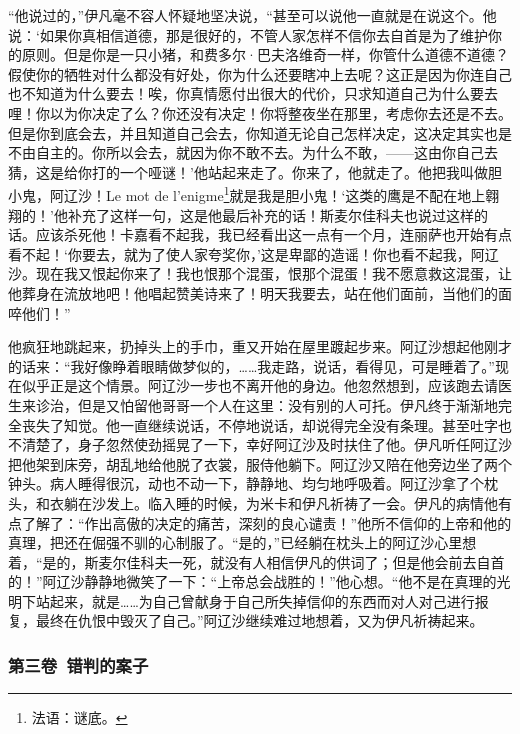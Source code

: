 \par “他说过的，”伊凡毫不容人怀疑地坚决说，“甚至可以说他一直就是在说这个。他说：‘如果你真相信道德，那是很好的，不管人家怎样不信你去自首是为了维护你的原则。但是你是一只小猪，和费多尔·巴夫洛维奇一样，你管什么道德不道德？假使你的牺牲对什么都没有好处，你为什么还要瞎冲上去呢？这正是因为你连自己也不知道为什么要去！唉，你真情愿付出很大的代价，只求知道自己为什么要去哩！你以为你决定了么？你还没有决定！你将整夜坐在那里，考虑你去还是不去。但是你到底会去，并且知道自己会去，你知道无论自己怎样决定，这决定其实也是不由自主的。你所以会去，就因为你不敢不去。为什么不敢，——这由你自己去猜，这是给你打的一个哑谜！’他站起来走了。你来了，他就走了。他把我叫做胆小鬼，阿辽沙！Le mot de l’enigme\footnote{法语：谜底。}就是我是胆小鬼！‘这类的鹰是不配在地上翱翔的！’他补充了这样一句，这是他最后补充的话！斯麦尔佳科夫也说过这样的话。应该杀死他！卡嘉看不起我，我已经看出这一点有一个月，连丽萨也开始有点看不起！‘你要去，就为了使人家夸奖你，’这是卑鄙的造谣！你也看不起我，阿辽沙。现在我又恨起你来了！我也恨那个混蛋，恨那个混蛋！我不愿意救这混蛋，让他葬身在流放地吧！他唱起赞美诗来了！明天我要去，站在他们面前，当他们的面啐他们！”
\par 他疯狂地跳起来，扔掉头上的手巾，重又开始在屋里踱起步来。阿辽沙想起他刚才的话来：“我好像睁着眼睛做梦似的，……我走路，说话，看得见，可是睡着了。”现在似乎正是这个情景。阿辽沙一步也不离开他的身边。他忽然想到，应该跑去请医生来诊治，但是又怕留他哥哥一个人在这里：没有别的人可托。伊凡终于渐渐地完全丧失了知觉。他一直继续说话，不停地说话，却说得完全没有条理。甚至吐字也不清楚了，身子忽然使劲摇晃了一下，幸好阿辽沙及时扶住了他。伊凡听任阿辽沙把他架到床旁，胡乱地给他脱了衣裳，服侍他躺下。阿辽沙又陪在他旁边坐了两个钟头。病人睡得很沉，动也不动一下，静静地、均匀地呼吸着。阿辽沙拿了个枕头，和衣躺在沙发上。临入睡的时候，为米卡和伊凡祈祷了一会。伊凡的病情他有点了解了：“作出高傲的决定的痛苦，深刻的良心谴责！”他所不信仰的上帝和他的真理，把还在倔强不驯的心制服了。“是的，”已经躺在枕头上的阿辽沙心里想着，“是的，斯麦尔佳科夫一死，就没有人相信伊凡的供词了；但是他会前去自首的！”阿辽沙静静地微笑了一下：“上帝总会战胜的！”他心想。“他不是在真理的光明下站起来，就是……为自己曾献身于自己所失掉信仰的东西而对人对己进行报复，最终在仇恨中毁灭了自己。”阿辽沙继续难过地想着，又为伊凡祈祷起来。


\subsubsection*{第三卷\ 错判的案子}


